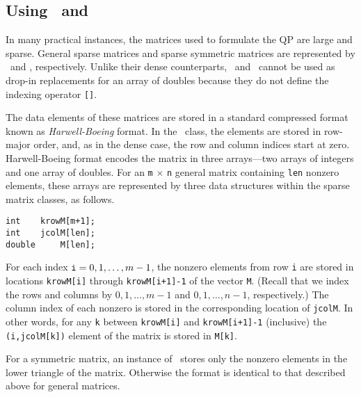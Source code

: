 \subsection{Using \SparseGenMatrix\ and \SparseSymMatrix}
\label{sec.using-sparse}

In many practical instances, the matrices used to formulate the QP are
large and sparse. General sparse matrices and sparse symmetric
matrices are represented by \SparseGenMatrix\ and \SparseSymMatrix,
respectively. Unlike their dense counterparts, \SparseGenMatrix\ and
\SparseSymMatrix\ cannot be used as drop-in replacements for an array
of doubles because they do not define the indexing operator \verb-[]-.

The data elements of these matrices are stored in a standard
compressed format known as {\em Harwell-Boeing} format. In the
\SparseGenMatrix\ class, the elements are stored in row-major order,
and, as in the dense case, the row and column indices start at zero.
Harwell-Boeing format encodes the matrix in three arrays---two arrays
of integers and one array of doubles. For an {\tt m} $\times$ {\tt n}
general matrix containing {\tt len} nonzero elements, these arrays are
represented by three data structures within the sparse matrix classes,
as follows.
\begin{verbatim}
int    krowM[m+1];
int    jcolM[len];
double     M[len];
\end{verbatim}
For each index ${\tt i}=0,1,\dots,m-1$, the nonzero elements from row
\texttt{i} are stored in locations \texttt{krowM[i]} through
\texttt{krowM[i+1]-1} of the vector \texttt{M}. (Recall that we index
the rows and columns by $0,1,\dots,m-1$ and $0,1,\dots,n-1$,
respectively.) The column index of each nonzero is stored in the
corresponding location of \texttt{jcolM}. In other words, for any
\texttt{k} between \texttt{krowM[i]} and \texttt{krowM[i+1]-1}
(inclusive) the \texttt{(i,jcolM[k])} element of the matrix is stored
in \texttt{M[k]}.

For a symmetric matrix, an instance of \SparseSymMatrix\ stores only
the nonzero elements in the lower triangle of the matrix. Otherwise
the format is identical to that described above for general matrices.


